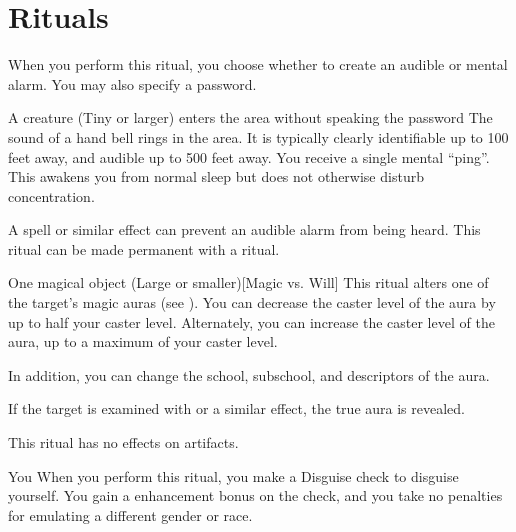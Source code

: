 \section{Rituals}

\small

\spelldur{\durext \dismissable}
\spellspecial When you perform this ritual, you choose whether to create an audible or mental alarm. You may also specify a password.
\spellline
\begin{spelltrigger}{A creature (Tiny or larger) enters the area without speaking the password}
     The sound of a hand bell rings in the area. It is typically clearly identifiable up to 100 feet away, and audible up to 500 feet away.
     You receive a single mental ``ping''. This awakens you from normal sleep but does not otherwise disturb concentration.
\end{spelltrigger}
\spellnotes A  spell or similar effect can prevent an audible alarm from being heard. This ritual can be made permanent with a  ritual.

\begin{spelltarget}{One magical object (Large or smaller)}[Magic vs. Will]
    \spellsuccess This ritual alters one of the target's magic auras (see ). You can decrease the caster level of the aura by up to half your caster level. Alternately, you can increase the caster level of the aura, up to a maximum of your caster level.

    In addition, you can change the school, subschool, and descriptors of the aura.
\end{spelltarget}
\spellnotes If the target is examined with  or a similar effect, the true aura is revealed.

\par This ritual has no effects on artifacts.

\spelldur{\durlong}
\begin{spelltarget}{You}
    \spelleffect When you perform this ritual, you make a Disguise check to disguise yourself. You gain a  enhancement bonus on the check, and you take no penalties for emulating a different gender or race.
\end{spelltarget}

